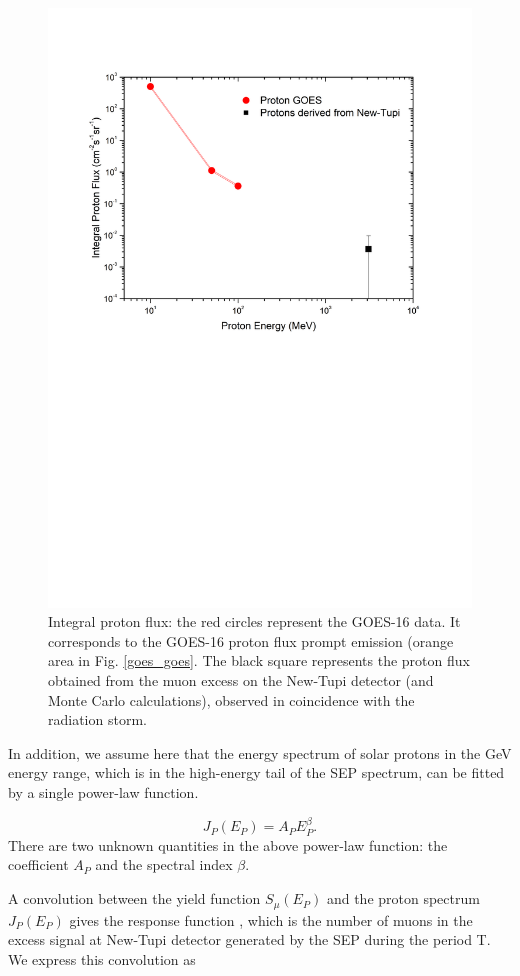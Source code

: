 \documentclass[twocolumn]{aastex63}
\begin{document}
\begin{figure}[]
\vspace*{-1.0cm}
\hspace*{-1.5cm}
\centering
\includegraphics[clip,width=0.6
\textwidth,height=0.7\textheight,angle=0.] {Fig8.png}
\vspace*{-7.0cm}
\caption{Integral proton flux: the red circles represent the GOES-16 data. It corresponds to the GOES-16 proton flux prompt emission  (orange area in Fig. \ref{goes_goes}.
 The black square represents the proton flux obtained from
the muon excess on the New-Tupi detector (and Monte Carlo calculations), observed in coincidence with
the radiation storm. 
}
\label{tupi_flux}
\end{figure} 

In addition, we assume here that the energy spectrum of solar protons in the GeV energy range, which is in the high-energy tail of the SEP spectrum, can be fitted by a single power-law function.

\begin{equation}
J_P(E_P)=A_PE_P^{\beta}.
\label{power}
\end{equation} 
There are two unknown quantities in the above power-law function: the coefficient $A_P$ and the spectral index $\beta$.


A convolution between the yield function $S_{\mu}(E_P)$  and the proton spectrum $J_P(E_P)$ gives the response function \citep{augu16b}, which is the number of muons in the excess signal at New-Tupi detector generated by the SEP during the period T. We express this convolution as
\end{document}
